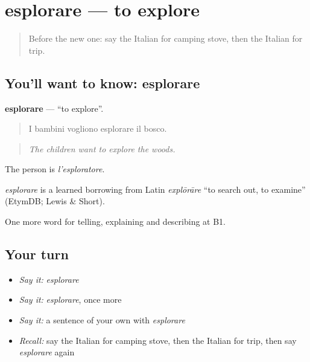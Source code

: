 \section[esplorare]{esplorare — to explore}

\label{lesson:IT-C502-esplorare}



\begin{quote}
Before the new one: say the Italian for camping stove, then the Italian for trip.
\end{quote}

\subsection*{You'll want to know: esplorare}
\textbf{esplorare} — \textquotedblleft{}to explore\textquotedblright{}.

\begin{quote}
I bambini vogliono esplorare il bosco.
\end{quote}

\begin{quote}
\emph{The children want to explore the woods.}
\end{quote}

The person is \emph{l'esploratore}.

\begin{cousinweb}
\emph{esplorare} is a learned borrowing from Latin \emph{explōrāre} \textquotedblleft{}to search out, to examine\textquotedblright{} (EtymDB; Lewis \& Short).
\end{cousinweb}

\begin{grammarlens}[title={What you've built}]
One more word for telling, explaining and describing at B1.
\end{grammarlens}

\subsection*{Your turn}
\begin{itemize}
\raggedright
  \item \emph{Say it:} \emph{esplorare}
  \item \emph{Say it:} \emph{esplorare}, once more
  \item \emph{Say it:} a sentence of your own with \emph{esplorare}
  \item \emph{Recall:} say the Italian for camping stove, then the Italian for trip, then say \emph{esplorare} again
\end{itemize}

